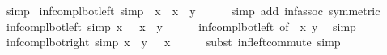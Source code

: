 \begin{isabellebody}
\ simp%
\endisatagproof
{\isafoldproof}%
%
\isadelimproof
\isanewline
%
\endisadelimproof
\isanewline
{}\isamarkupfalse%
\ inf{\isacharunderscore}{\kern0pt}compl{\isacharunderscore}{\kern0pt}bot{\isacharunderscore}{\kern0pt}left{}\ {\isacharbrackleft}{\kern0pt}simp{\isacharbrackright}{\kern0pt}{\isacharcolon}{\kern0pt}\ {\isacartoucheopen}{\isacharminus}{\kern0pt}\ x\ {\isasymsqinter}\ {\isacharparenleft}{\kern0pt}x\ {\isasymsqinter}\ y{\isacharparenright}{\kern0pt}\ {\isacharequal}{\kern0pt}\ {\isasymbottom}{\isacartoucheclose}\isanewline
%
\isadelimproof
\ \ %
\endisadelimproof
%
\isatagproof
{}\isamarkupfalse%
\ {\isacharparenleft}{\kern0pt}simp\ add{\isacharcolon}{\kern0pt}\ inf{\isacharunderscore}{\kern0pt}assoc\ {\isacharbrackleft}{\kern0pt}symmetric{\isacharbrackright}{\kern0pt}{\isacharparenright}{\kern0pt}%
\endisatagproof
{\isafoldproof}%
%
\isadelimproof
\isanewline
%
\endisadelimproof
\isanewline
{}\isamarkupfalse%
\ inf{\isacharunderscore}{\kern0pt}compl{\isacharunderscore}{\kern0pt}bot{\isacharunderscore}{\kern0pt}left{}\ {\isacharbrackleft}{\kern0pt}simp{\isacharbrackright}{\kern0pt}{\isacharcolon}{\kern0pt}\ {\isacartoucheopen}x\ {\isasymsqinter}\ {\isacharparenleft}{\kern0pt}{\isacharminus}{\kern0pt}\ x\ {\isasymsqinter}\ y{\isacharparenright}{\kern0pt}\ {\isacharequal}{\kern0pt}\ {\isasymbottom}{\isacartoucheclose}\isanewline
%
\isadelimproof
\ \ %
\endisadelimproof
%
\isatagproof
{}\isamarkupfalse%
\ inf{\isacharunderscore}{\kern0pt}compl{\isacharunderscore}{\kern0pt}bot{\isacharunderscore}{\kern0pt}left{}\ {\isacharbrackleft}{\kern0pt}of\ {\isachardoublequoteopen}{\isacharminus}{\kern0pt}\ x{\isachardoublequoteclose}\ y{\isacharbrackright}{\kern0pt}\ \isamarkupfalse%
\ simp%
\endisatagproof
{\isafoldproof}%
%
\isadelimproof
\isanewline
%
\endisadelimproof
\isanewline
{}\isamarkupfalse%
\ inf{\isacharunderscore}{\kern0pt}compl{\isacharunderscore}{\kern0pt}bot{\isacharunderscore}{\kern0pt}right\ {\isacharbrackleft}{\kern0pt}simp{\isacharbrackright}{\kern0pt}{\isacharcolon}{\kern0pt}\ {\isacartoucheopen}x\ {\isasymsqinter}\ {\isacharparenleft}{\kern0pt}y\ {\isasymsqinter}\ {\isacharminus}{\kern0pt}\ x{\isacharparenright}{\kern0pt}\ {\isacharequal}{\kern0pt}\ {\isasymbottom}{\isacartoucheclose}\isanewline
%
\isadelimproof
\ \ %
\endisadelimproof
%
\isatagproof
{}\isamarkupfalse%
\ {\isacharparenleft}{\kern0pt}subst\ inf{\isacharunderscore}{\kern0pt}left{\isacharunderscore}{\kern0pt}commute{\isacharparenright}{\kern0pt}\ simp%

\end{isabellebody}
